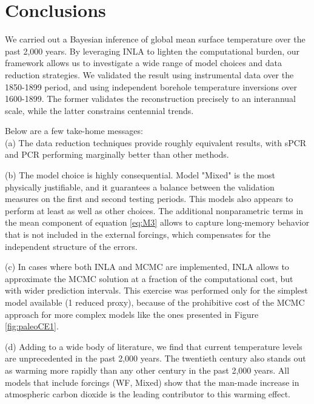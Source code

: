 \documentclass[12pt]{amsart}
\theoremstyle{plain}
\theoremstyle{definition}
\theoremstyle{remark}
\begin{document}
\section{Conclusions}
We carried out a Bayesian inference of global mean surface temperature over
the past 2,000 years. By leveraging INLA to lighten the computational burden, our framework allows us to investigate a wide range of model choices and data reduction strategies.  We validated the result using instrumental data over the 1850-1899 period, and using independent borehole temperature inversions over 1600-1899. The former validates the reconstruction precisely to an interannual scale, while the latter constrains centennial trends.  

Below are a few take-home messages:\\
     (a) The data reduction techniques provide roughly equivalent results, with
      sPCR and PCR performing marginally better than other methods.
    
     \noindent (b) The model choice is highly consequential. Model "Mixed" is the most
      physically justifiable, and it guarantees a balance between the
      validation measures on the first and second testing periods. This models also
      appears to perform at least as well as other choices. The 
      additional nonparametric terms in the mean component of equation \eqref{eq:M3} allows
      to capture long-memory behavior that is not included in the external forcings, which compensates for the independent structure of the errors. 
      
     \noindent (c) In cases where both INLA and MCMC are implemented, INLA allows to approximate the MCMC
      solution at a fraction of the computational cost, but with wider
      prediction intervals. This exercise was performed only for the simplest
      model available (1 reduced proxy), because of the prohibitive cost of the
      MCMC approach for more complex models like the ones presented in Figure
      \ref{fig:paleoCE1}. 
      
     \noindent (d) Adding to a wide body of literature, we find that current temperature levels are unprecedented in the past 2,000 years. 
      The twentieth century also stands out as warming more rapidly than any other
      century in the past 2,000 years. All models that include forcings (WF, Mixed) show that the man-made increase in atmospheric carbon dioxide is the leading contributor to this warming effect. 
\end{document}
